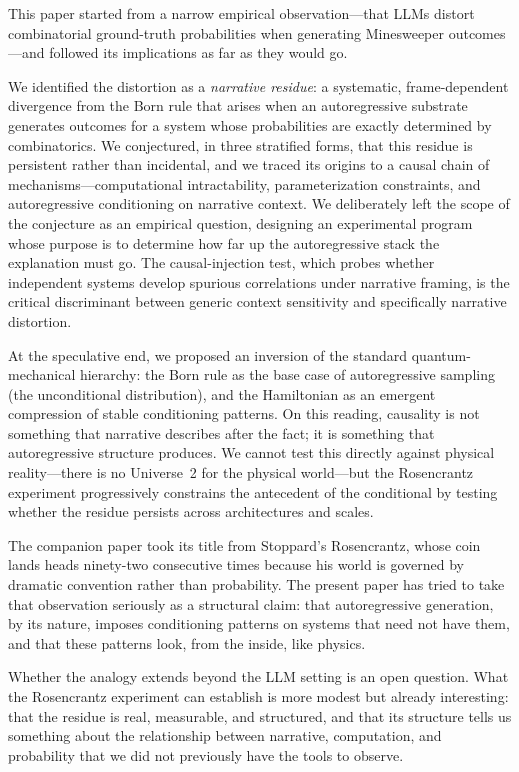 \documentclass[12pt,a4paper]{article}
\theoremstyle{definition}
\theoremstyle{remark}
\begin{document}
This paper started from a narrow empirical observation---that LLMs
distort combinatorial ground-truth probabilities when generating
Minesweeper outcomes---and followed its implications as far as they
would go.

We identified the distortion as a \emph{narrative residue}: a
systematic, frame-dependent divergence from the Born rule that
arises when an autoregressive substrate generates outcomes for a
system whose probabilities are exactly determined by combinatorics.
We conjectured, in three stratified forms, that this residue is
persistent rather than incidental, and we traced its origins to a
causal chain of mechanisms---computational intractability,
parameterization constraints, and autoregressive conditioning on
narrative context.  We deliberately left the scope of the conjecture
as an empirical question, designing an experimental program whose
purpose is to determine how far up the autoregressive stack the
explanation must go.  The causal-injection test, which probes whether
independent systems develop spurious correlations under narrative
framing, is the critical discriminant between generic context
sensitivity and specifically narrative distortion.

At the speculative end, we proposed an inversion of the standard
quantum-mechanical hierarchy: the Born rule as the base case of
autoregressive sampling (the unconditional distribution), and the
Hamiltonian as an emergent compression of stable conditioning
patterns.  On this reading, causality is not something that
narrative describes after the fact; it is something that
autoregressive structure produces.  We cannot test this directly
against physical reality---there is no Universe~2 for the physical
world---but the Rosencrantz experiment progressively constrains
the antecedent of the conditional by testing whether the residue
persists across architectures and scales.

The companion paper \citep{Baldo2026Rosencrantz} took its title
from Stoppard's Rosencrantz, whose coin lands heads ninety-two
consecutive times because his world is governed by dramatic
convention rather than probability.  The present paper has tried
to take that observation seriously as a structural claim: that
autoregressive generation, by its nature, imposes conditioning
patterns on systems that need not have them, and that these
patterns look, from the inside, like physics.

Whether the analogy extends beyond the LLM setting is an open
question.  What the Rosencrantz experiment can establish is more
modest but already interesting: that the residue is real,
measurable, and structured, and that its structure tells us
something about the relationship between narrative, computation,
and probability that we did not previously have the tools to
observe.
\end{document}
